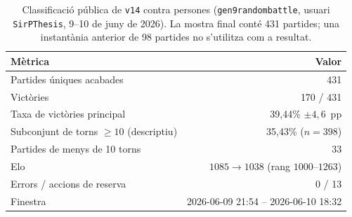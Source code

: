 \begin{table}[htbp]
\centering
\caption[Classificació pública de \texttt{v14} contra persones.]{Classificació pública de \texttt{v14} contra persones (\texttt{gen9randombattle}, usuari \texttt{SirPThesis}, 9--10 de juny de 2026). La mostra final conté 431 partides; una instantània anterior de 98 partides no s'utilitza com a resultat.}
\label{tab:ladder_v14}
\small
\begin{tabular}{lr}
\toprule
\textbf{Mètrica} & \textbf{Valor} \\
\midrule
Partides úniques acabades & 431 \\
Victòries & 170 / 431 \\
Taxa de victòries principal & 39,44\% $\pm 4{,}6$~pp \\
Subconjunt de torns $\ge 10$ (descriptiu) & 35,43\% ($n=398$) \\
Partides de menys de 10 torns & 33 \\
Elo & $1085 \rightarrow 1038$ (rang $1000$--$1263$) \\
Errors / accions de reserva & 0 / 13 \\
Finestra & 2026-06-09 21:54 -- 2026-06-10 18:32 \\
\bottomrule
\end{tabular}
\end{table}
